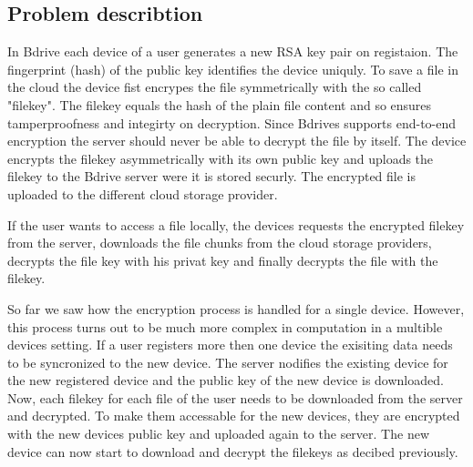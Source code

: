 


\subsection{Problem describtion}

In Bdrive each device of a user generates a new RSA key pair on registaion. The fingerprint (hash) of the public key identifies the device uniquly. To save a file in the cloud the device fist encrypes the file symmetrically with the so called "filekey". The filekey equals the hash of the plain file content and so ensures tamperproofness and integirty on decryption. Since Bdrives supports end-to-end encryption the server should never be able to decrypt the file by itself. The device encrypts the filekey asymmetrically with its own public key and uploads the filekey to the Bdrive server were it is stored securly. The encrypted file is uploaded to the different cloud storage provider. 

If the user wants to access a file locally, the devices requests the encrypted filekey from the server, downloads the file chunks from the cloud storage providers, decrypts the file key with his privat key and finally decrypts the file with the filekey. 

So far we saw how the encryption process is handled for a single device. However, this process turns out to be much more complex in computation in a multible devices setting.  If a user registers more then one device the exisiting data needs to be syncronized to the new device. The server nodifies the existing device for the new registered device and the public key of the new device is downloaded. Now, each filekey for each file of the user needs to be downloaded from the server and decrypted. To make them accessable for the new devices, they are encrypted with the new devices public key and uploaded again to the server. The new device can now start to download and decrypt the filekeys as decibed previously. 

